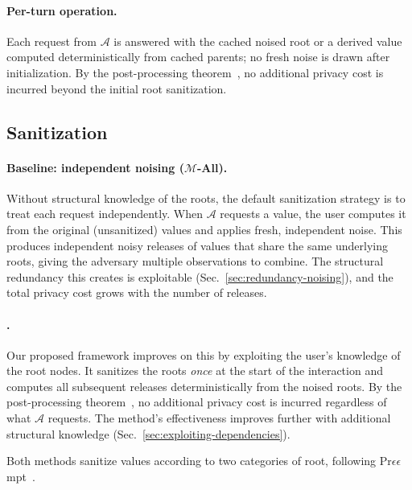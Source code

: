 \paragraph{Per-turn operation.} Each request from $\mathcal{A}$ is answered with the cached noised root or a derived value computed deterministically from cached parents; no fresh noise is drawn after initialization. By the post-processing theorem~\cite{dwork2006calibrating}, no additional privacy cost is incurred beyond the initial root sanitization.

\subsection{Sanitization}
\label{sec:sanitization}

\paragraph{Baseline: independent noising ($\mathcal{M}$-All).} Without structural knowledge of the roots, the default sanitization strategy is to treat each request independently. When $\mathcal{A}$ requests a value, the user computes it from the original (unsanitized) values and applies fresh, independent noise. This produces independent noisy releases of values that share the same underlying roots, giving the adversary multiple observations to combine. The structural redundancy this creates is exploitable (Sec.~\ref{sec:redundancy-noising}), and the total privacy cost grows with the number of releases.
 
\paragraph{\sysname{}.} Our proposed framework improves on this by exploiting the user's knowledge of the root nodes. It sanitizes the roots \emph{once} at the start of the interaction and computes all subsequent releases deterministically from the noised roots. By the post-processing theorem~\cite{dwork2006calibrating}, no additional privacy cost is incurred regardless of what $\mathcal{A}$ requests. The method's effectiveness improves further with additional structural knowledge (Sec.~\ref{sec:exploiting-dependencies}).
 
Both methods sanitize values according to two categories of root, following Pr$\epsilon\epsilon$mpt~\cite{chowdhury2025}.
 
